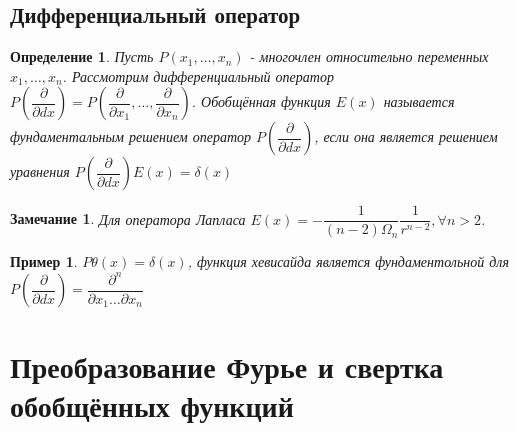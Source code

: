 \documentclass[9pt, a4paper]{article}
\newtheorem*{notabene}{Замечание}
\newtheorem*{definition}{Определение}
\newtheorem*{sample}{Пример}
\begin{document}
	\subsection{Дифференциальный оператор}
		\begin{definition}
			Пусть  $P(x_1, \dots, x_n)$ - многочлен относительно переменных $x_1, \dots, x_n$. Рассмотрим дифференциальный оператор $P(\dfrac{\partial }{\partial dx}) = P(\dfrac{\partial}{\partial x_1}, \dots, \dfrac{\partial}{\partial x_n})$. Обобщённая функция $E(x)$ называется фундаментальным решением оператор  $P(\dfrac{\partial }{\partial dx})$, если она является решением уравнения  $P(\dfrac{\partial }{\partial dx})  E(x) = \delta(x)$ 
		\end{definition}
		\begin{notabene}
			Для оператора Лапласа $E(x) = - \dfrac{1}{(n-2)\Omega_n} \dfrac{1}{r^{n-2}}, \forall n > 2$.
		\end{notabene}
		\begin{sample}
			$P\theta(x) = \delta(x)$, функция хевисайда является фундаментольной для  $P(\dfrac{\partial }{\partial dx}) = \dfrac{\partial^n}{\partial x_1 \dots \partial x_n}$
		\end{sample}
\section{Преобразование Фурье и свертка обобщённых функций}
\end{document}
